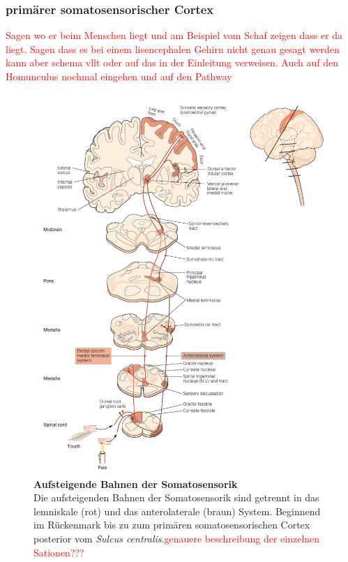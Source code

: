\documentclass[12pt,a4paper,pdftex]{article}
\begin{document}
\subsubsection*{primärer somatosensorischer Cortex}
\textcolor{red}{Sagen wo er beim Menschen liegt und am Beispiel vom Schaf zeigen dass er da liegt. Sagen dass es bei einem lisencephalen Gehirn nicht genau gesagt werden kann aber schema vllt oder auf das in der Einleitung verweisen. Auch auf den Homunculus nochmal eingehen und auf den Pathway }

\begin{figure}[H]
    \centering
    \includegraphics{pictures/somatosensory/pathway_somatosensory2.png}
    \caption[Aufsteigende Bahnen der Somatosensorik]{\textbf{Aufsteigende Bahnen der Somatosensorik}\\
    Die aufsteigenden Bahnen der Somatosensorik sind getrennt in das lemniskale (rot) und das anterolaterale (braun) System. Beginnend im Rückenmark bis zu zum primären somatosensorischen Cortex posterior vom \textit{Sulcus centralis}.\textcolor{red}{genauere beschreibung der einzelnen Sationen???}\\
    \cite[Kap.~22]{kandel2013principles}}
    \label{fig:somato_pathway}
\end{figure}
\end{document}

